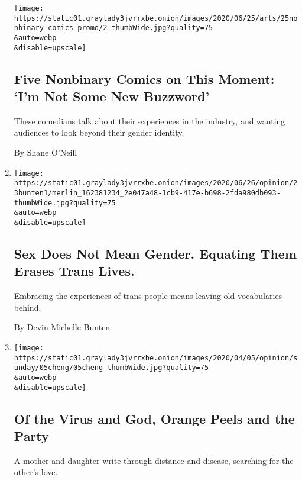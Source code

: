 \begin{enumerate}
  \texttt{[image: https://static01.graylady3jvrrxbe.onion/images/2020/06/25/arts/25nonbinary-comics-promo/2-thumbWide.jpg?quality=75\\\&auto=webp\\\&disable=upscale]}

  \hypertarget{five-nonbinary-comics-on-this-moment-im-not-some-new-buzzword}{%
  \subsection{Five Nonbinary Comics on This Moment: `I'm Not Some New
  Buzzword'}\label{five-nonbinary-comics-on-this-moment-im-not-some-new-buzzword}}

  These comedians talk about their experiences in the industry, and
  wanting audiences to look beyond their gender identity.

  By Shane O'Neill
\item
  \href{/2020/06/23/opinion/trans-gender-language-trump.html}{}

  \texttt{[image: https://static01.graylady3jvrrxbe.onion/images/2020/06/26/opinion/23bunten1/merlin\_162381234\_2e047a48-1cb9-417e-b698-2fda980db093-thumbWide.jpg?quality=75\\\&auto=webp\\\&disable=upscale]}

  \hypertarget{sex-does-not-mean-gender-equating-them-erases-trans-lives}{%
  \subsection{Sex Does Not Mean Gender. Equating Them Erases Trans
  Lives.}\label{sex-does-not-mean-gender-equating-them-erases-trans-lives}}

  Embracing the experiences of trans people means leaving old
  vocabularies behind.

  By Devin Michelle Bunten
\item
  \href{/2020/04/03/opinion/sunday/coronavirus-china-US.html}{}

  \texttt{[image: https://static01.graylady3jvrrxbe.onion/images/2020/04/05/opinion/sunday/05cheng/05cheng-thumbWide.jpg?quality=75\\\&auto=webp\\\&disable=upscale]}

  \hypertarget{of-the-virus-and-god-orange-peels-and-the-party}{%
  \subsection{Of the Virus and God, Orange Peels and the
  Party}\label{of-the-virus-and-god-orange-peels-and-the-party}}

  A mother and daughter write through distance and disease, searching
  for the other's love.


\end{enumerate}
